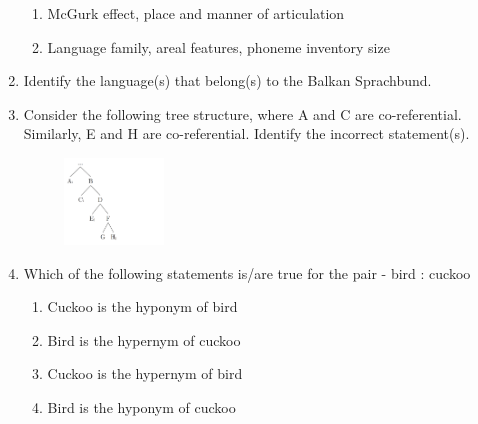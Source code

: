 \documentclass[12pt]{article}
\theoremstyle{remark}
\begin{document}
\begin{enumerate}
\begin{enumerate}
\item McGurk effect, place and manner of articulation 
\item Language family, areal features, phoneme inventory size
\end{enumerate}
\hfill{}
\item Identify the language(s) that belong(s) to the Balkan Sprachbund.
\begin{enumerate}  \end{enumerate}
\hfill{}
\item Consider the following tree structure, where A and C are co-referential. Similarly, E and H are co-referential. Identify the incorrect statement(s).
\begin{figure}[H]
\centering
\includegraphics[width=0.25\textwidth]{Figs/Q61.png}
\caption{}
\label{fig:3.6}
\end{figure}
\begin{enumerate}  \end{enumerate}
\hfill{}
\item Which of the following statements is/are true for the pair - bird : cuckoo
\begin{enumerate} 
\item Cuckoo is the hyponym of bird
\item Bird is the hypernym of cuckoo
\item Cuckoo is the hypernym of bird
\item Bird is the hyponym of cuckoo

\end{enumerate}
\end{enumerate}
\end{document}

